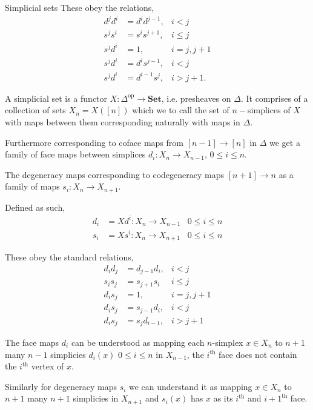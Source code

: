 \documentclass[10pt]{beamer}
\begin{document}
\begin{frame}{Simplicial sets}
	These obey the relations,
	\begin{align*}
		d^j d^i &= d^i d^{j-1}, & i < j \\
		s^j s^i &= s^i s^{j+1}, & i \leq j \\
		s^j d^i &= 1, & i = j, j+1 \\
		s^j d^i &= d^i s^{j-1}, & i < j \\
		s^j d^i &= d^{i-1} s^j, & i > j+1.
	\end{align*}
\pagebreak
	\begin{definition}
		A simplicial set is a functor $X: \Delta^\mathrm{op} \to \mathbf{Set}$, i.e. presheaves on $\Delta$. It comprises of a collection of sets $X_n =X([n])$ which we to call the set of $n-$simplices of $X$ with maps between them corresponding naturally with maps in $\Delta$.
	\end{definition}
	
	
	
	Furthermore corresponding to coface maps from $[n-1] \to [n]$ in $\Delta$ we get a family of face maps between simplices $d_i:X_n \to X_{n-1}$, $0\leq i \leq n$.
	
	The degeneracy maps corresponding to codegeneracy maps $ [n+1] \to n$ as a family of maps $s_i: X_n \to X_{n+1}$.
	
	Defined as such,
	\begin{align*}
		d_i &= X d^i : X_n \to X_{n-1} & 0 \leq i \leq n \\
		s_i &= X s^i : X_n \to X_{n+1} & 0 \leq i \leq n
	\end{align*}
	
	
	These obey the standard relations,
	\begin{align*}
		d_id_j &= d_{j-1}d_i, &i <j\\
		s_is_j&=s_{j+1}s_i &i \leq j\\
		d_is_j&=1, &i=j,j+1\\
		d_is_j&=s_{j-1}d_i,& i<j\\
		d_is_j&=s_jd_{i-1},& i>j+1
	\end{align*}
	
	The face maps $d_i$ can be understood as mapping each $n$-simplex $x\in X_n$ to $n+1$ many $n-1$ simplicies $d_i(x)$ $0\leq i \leq n$ in $X_{n-1} $, the $i^\mathrm{th}$ face does not contain the $i^{\mathrm{th}}$ vertex of $x$. 
	
	Similarly for degeneracy maps $s_i$ we can understand it as mapping $x \in X_n $ to $n+1$ many $n+1$ simplicies in $X_{n+1} $ and $s_i(x)$ has $x$ as its $i^{\mathrm{th}} $ and $i+1^{\mathrm{th}}$ face. 
	

\end{frame}
\end{document}
